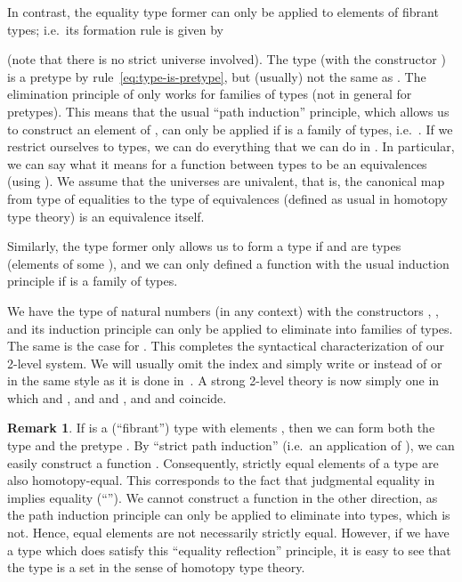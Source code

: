 \documentclass[a4paper,reqno]{amsart}
\theoremstyle{plain}
\theoremstyle{definition}
\newtheorem{remark}[theorem]{Remark}
\begin{document}
In contrast, the equality type former  can only be applied to elements of fibrant types; i.e.\ its formation rule is given by

(note that there is no strict universe  involved).
The type  (with the constructor ) is a pretype by rule~\eqref{eq:type-is-pretype}, but (usually) not the same as .
The elimination principle of  only works for families of types (not in general for pretypes).
This means that the usual ``path induction'' principle, which allows us to construct an element of , can only be applied if  is a family of types, i.e.\ .
If we restrict ourselves to types, we can do everything that we can do in . 
In particular, we can say what it means for a function between types to be an equivalences (using ).
We assume that the universes  are univalent, that is, the canonical map from type of equalities  to the type of equivalences  (defined as usual in homotopy type theory) is an equivalence itself.

Similarly, the type former  only allows us to form a type  if  and  are types (elements of some ), and we can only defined a function  with the usual induction principle if  is a family of types.

We have the type of natural numbers  (in any context) with the constructors , , and its induction principle can only be applied to eliminate into families of types.
The same is the case for .
This completes the syntactical characterization of our 2-level system.
We will usually omit the index and simply write  or  instead of  or  in the same style as it is done in~\cite{HoTTbook}.
A strong 2-level theory is now simply one in which  and , and  and , and  and  coincide.

\begin{remark}
 If  is a (``fibrant'') type with elements , then we can form both the type  and the pretype . 
 By ``strict path induction'' (i.e.\ an application of ), we can easily construct a function .
 Consequently, strictly equal elements of a type are also homotopy-equal.
 This corresponds to the fact that judgmental equality in  implies equality (``'').
 We cannot construct a function in the other direction, as the path induction principle  can only be applied to eliminate into types, which  is not. 
 Hence, equal elements are not necessarily strictly equal.
 However, if we have a type which does satisfy this ``equality reflection'' principle, it is easy to see that the type is a set in the sense of homotopy type theory.
\end{remark}
\end{document}
